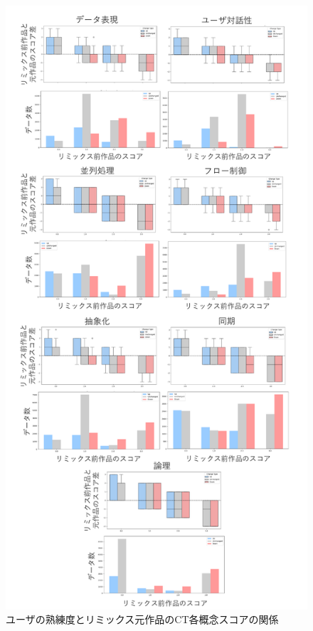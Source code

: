 \documentclass[submit,techrep,noauthor]{ipsj}
\begin{document}
\begin{figure}[h]
  \centering
  \includegraphics[width=\linewidth]{@IPSJ_SIGSE202511_Horio/fig/preAnalysis2.pdf}
  \caption{ユーザの熟練度とリミックス元作品のCT各概念スコアの関係}
  \label{preAnalysis2}
\end{figure}
\end{document}
